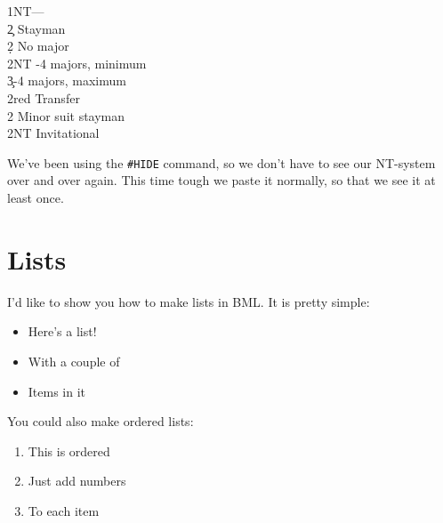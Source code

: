 \documentclass[a4paper]{article}
\begin{document}
\begin{bidtable}
1NT---\\
2\c \> Stayman\+\\
2\d \> No major\\
2NT -4 majors, minimum\\
3\c {}-4 majors, maximum\-\\
2red \> Transfer\\
2\s \> Minor suit stayman\\
2NT \> Invitational
\end{bidtable}

We've been using the \texttt{\#HIDE} command, so we don't have to see our
NT-system over and over again. This time tough we paste it
normally, so that we see it at least once.

\section{Lists}

I'd like to show you how to make lists in BML. It is pretty
simple:

\begin{itemize}
\item Here's a list!

\item With a couple of

\item Items in it

\end{itemize}

You could also make ordered lists:

\begin{enumerate}
\item This is ordered

\item Just add numbers

\item To each item

\end{enumerate}
\end{document}
